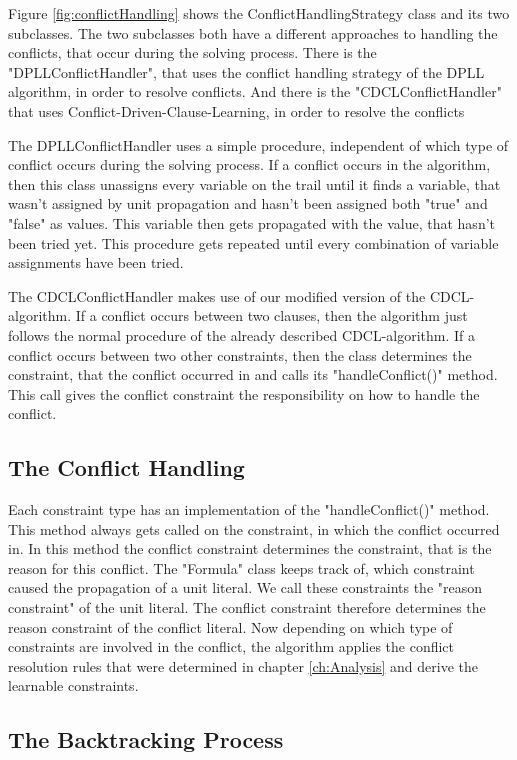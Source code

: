 Figure \ref{fig:conflictHandling} shows the ConflictHandlingStrategy class and its two subclasses. The two subclasses both have a different approaches to handling the conflicts, that occur during the solving process. There is the "DPLLConflictHandler", that uses the conflict handling strategy of the DPLL algorithm, in order to resolve conflicts. And there is the "CDCLConflictHandler" that uses Conflict-Driven-Clause-Learning, in order to resolve the conflicts
\par
The DPLLConflictHandler uses a simple procedure, independent of which type of conflict occurs during the solving process. If a conflict occurs in the algorithm, then this class unassigns every variable on the trail until it finds a variable, that wasn't assigned by unit propagation and hasn't been assigned both "true" and "false" as values. This variable then gets propagated with the value, that hasn't been tried yet. This procedure gets repeated until every combination of variable assignments have been tried.
\par
The CDCLConflictHandler makes use of our modified version of the CDCL-algorithm. If a conflict occurs between two clauses, then the algorithm just follows the normal procedure of the already described CDCL-algorithm. If a conflict occurs between two other constraints, then the class determines the constraint, that the conflict occurred in and calls its "handleConflict()" method. This call gives the conflict constraint the responsibility on how to handle the conflict.

\subsection{The Conflict Handling}

Each constraint type has an implementation of the "handleConflict()" method. This method always gets called on the constraint, in which the conflict occurred in. In this method the conflict constraint determines the constraint, that is the reason for this conflict. The "Formula" class keeps track of, which constraint caused the propagation of a unit literal. We call these constraints the "reason constraint" of the unit literal. The conflict constraint therefore determines the reason constraint of the conflict literal. Now depending on which type of constraints are involved in the conflict, the algorithm applies the conflict resolution rules that were determined in chapter \ref{ch:Analysis} and derive the learnable constraints.

\subsection{The Backtracking Process}

